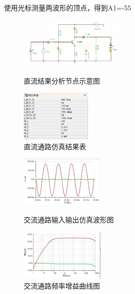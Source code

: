 \documentclass[]{article}
\begin{document}
使用光标测量两波形的顶点，得到A1=-55


\begin{figure}[h]
	\centering
	
	\begin{minipage}{0.4\linewidth}
		\centering
		\includegraphics[height=2.5cm]{img/4_3}
		\caption{直流结果分析节点示意图}
	\end{minipage}
	\begin{minipage}{0.4\linewidth}
		\centering
		\includegraphics[height=2.5cm]{img/4_4}
		\caption{直流通路仿真结果表}
	\end{minipage}
	
\end{figure}

\begin{figure}[h]
	\centering
	
	\begin{minipage}{0.4\linewidth}
		\centering
		\includegraphics[height=2.5cm]{img/4_5}
		\caption{交流通路输入输出仿真波形图}
	\end{minipage}
	\begin{minipage}{0.4\linewidth}
		\centering
		\includegraphics[height=2.5cm]{img/4_6}
		\caption{交流通路频率增益曲线图}
	\end{minipage}
	
\end{figure}
\end{document}
